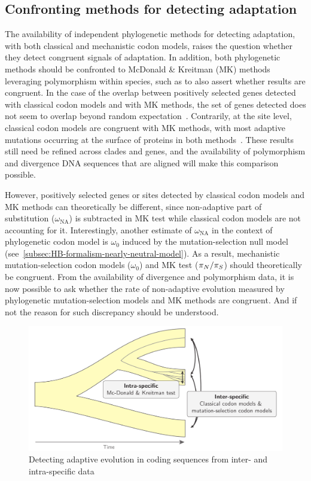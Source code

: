 \subsection{Confronting methods for detecting adaptation}
\label{subsec:confronting-methods-for-detecting-adaptation}

The availability of independent phylogenetic methods for detecting adaptation, with both classical and mechanistic codon models, raises the question whether they detect congruent signals of adaptation.
In addition, both phylogenetic methods should be confronted to McDonald \& Kreitman (\acrshort{MK}) methods leveraging polymorphism within species, such as to also assert whether results are congruent.
In the case of the overlap between positively selected genes detected with classical codon models and with \acrshort{MK} methods, the set of genes detected does not seem to overlap beyond random expectation~\citep{He2020}.
Contrarily, at the site level, classical codon models are congruent with \acrshort{MK} methods, with most adaptive mutations occurring at the surface of proteins in both methods~\citep{Moutinho2019}.
These results still need be refined across clades and genes, and the availability of polymorphism and divergence \acrshort{DNA} sequences that are aligned will make this comparison possible.

However, positively selected genes or sites detected by classical codon models and \acrshort{MK} methods can theoretically be different, since non-adaptive part of substitution ($\omega_{\text{NA}}$) is subtracted in \acrshort{MK} test while classical codon models are not accounting for it.
Interestingly, another estimate of $\omega_{\text{NA}}$ in the context of phylogenetic codon model is $\omega_0$ induced by the mutation-selection null model (see~\ref{subsec:HB-formalism-nearly-neutral-model}).
As a result, mechanistic mutation-selection codon models ($\omega_0$) and \acrshort{MK} test ($\pi_N / \pi_S$) should theoretically be congruent.
From the availability of divergence and polymorphism data, it is now possible to ask whether the rate of non-adaptive evolution measured by phylogenetic mutation-selection models and \acrshort{MK} methods are congruent.
And if not the reason for such discrepancy should be understood.

\begin{figure}[H]
    \centering
    \includegraphics[width=\textwidth] {figures/inter-intra}
    \caption{Detecting adaptive evolution in coding sequences from inter- and intra-specific data}
    \label{fig:detecting-adaptation-inter-intra}
\end{figure}

